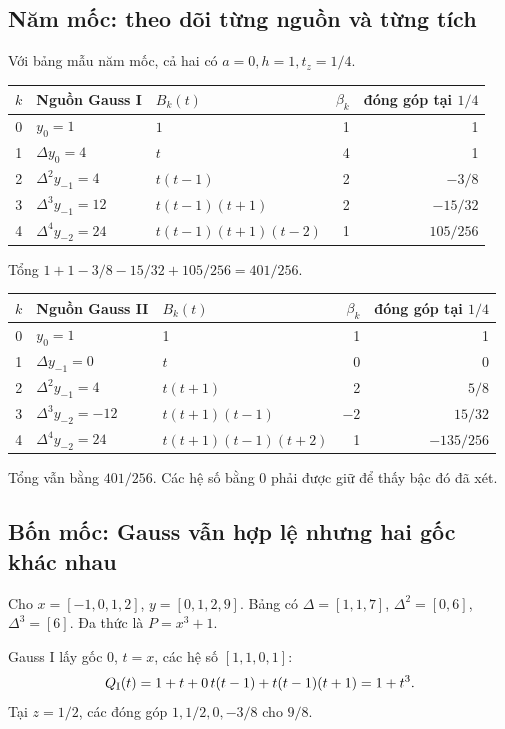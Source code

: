 \subsection{Năm mốc: theo dõi từng nguồn và từng tích}
Với bảng mẫu năm mốc, cả hai có $a=0,h=1,t_z=1/4$.
\begin{center}\small
\begin{tabular}{@{}rllrr@{}}\toprule
$k$ & Nguồn Gauss I & $B_k(t)$ & $\beta_k$ & đóng góp tại $1/4$\\\midrule
0 & $y_0=1$ & $1$ & 1 & 1\\
1 & $\Delta y_0=4$ & $t$ & 4 & 1\\
2 & $\Delta^2y_{-1}=4$ & $t(t-1)$ & 2 & $-3/8$\\
3 & $\Delta^3y_{-1}=12$ & $t(t-1)(t+1)$ & 2 & $-15/32$\\
4 & $\Delta^4y_{-2}=24$ & $t(t-1)(t+1)(t-2)$ & 1 & $105/256$\\\bottomrule
\end{tabular}\end{center}
Tổng $1+1-3/8-15/32+105/256=401/256$.
\begin{center}\small
\begin{tabular}{@{}rllrr@{}}\toprule
$k$ & Nguồn Gauss II & $B_k(t)$ & $\beta_k$ & đóng góp tại $1/4$\\\midrule
0 & $y_0=1$ & 1 & 1 & 1\\
1 & $\Delta y_{-1}=0$ & $t$ & 0 & 0\\
2 & $\Delta^2y_{-1}=4$ & $t(t+1)$ & 2 & $5/8$\\
3 & $\Delta^3y_{-2}=-12$ & $t(t+1)(t-1)$ & $-2$ & $15/32$\\
4 & $\Delta^4y_{-2}=24$ & $t(t+1)(t-1)(t+2)$ & 1 & $-135/256$\\\bottomrule
\end{tabular}\end{center}
Tổng vẫn bằng $401/256$. Các hệ số bằng 0 phải được giữ để thấy bậc đó đã xét.

\subsection{Bốn mốc: Gauss vẫn hợp lệ nhưng hai gốc khác nhau}
Cho $x=[-1,0,1,2]$, $y=[0,1,2,9]$. Bảng có $\Delta=[1,1,7]$, $\Delta^2=[0,6]$, $\Delta^3=[6]$. Đa thức là $P=x^3+1$.

Gauss I lấy gốc 0, $t=x$, các hệ số $[1,1,0,1]$:
\[
 Q_{\rm I}(t)=1+t+0\,t(t-1)+t(t-1)(t+1)=1+t^3.
\]
Tại $z=1/2$, các đóng góp $1,1/2,0,-3/8$ cho $9/8$.

